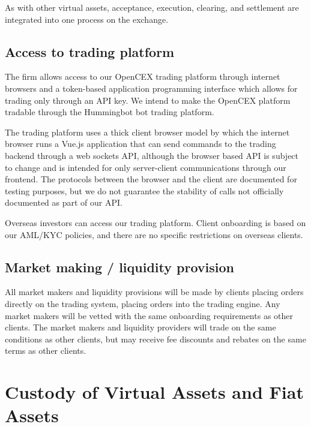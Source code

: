 As with other virtual assets, acceptance, execution, clearing, and
settlement are integrated into one process on the exchange.

\subsection{Access to trading platform}
The firm allows access to our OpenCEX trading platform through internet
browsers and a token-based application programming interface which
allows for trading only through an API key. We intend to make the
OpenCEX platform tradable through the Hummingbot bot trading platform.

The trading platform uses a thick client browser model by which the
internet browser runs a Vue.js application that can send commands to
the trading backend through a web sockets API, although the browser
based API is subject to change and is intended for only server-client
communications through our frontend.  The protocols between the browser
and the client are documented for testing purposes, but we do not
guarantee the stability of calls not officially documented as part of
our API.

Overseas investors can access our trading platform.  Client onboarding
is based on our AML/KYC policies, and there are no specific
restrictions on overseas clients.

\subsection{Market making / liquidity provision}
All market makers and liquidity provisions will be made by clients
placing orders directly on the trading system, placing orders into the trading
engine.  Any market makers will be vetted with the same onboarding
requirements as other clients.  The market makers and liquidity
providers will trade on the same conditions as other clients, but may
receive fee discounts and rebates on the same terms as other clients.

\section{Custody of Virtual Assets and Fiat Assets}

